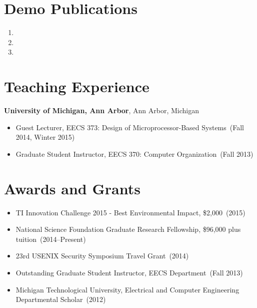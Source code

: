 \documentclass{article}
\begin{document}
\section*{Demo Publications}
\begin{enumerate}
  \item {}
  \item {}
  \item {}
\end{enumerate}




\section*{Teaching Experience}
\vspace{-6pt}
{\bf University of Michigan, Ann Arbor}, Ann Arbor, Michigan
\vspace{-6pt}
\begin{itemize}
  \item[] Guest Lecturer, EECS 373: Design of Microprocessor-Based Systems~(Fall 2014, Winter 2015)
  \item[] Graduate Student Instructor, EECS 370: Computer Organization~(Fall 2013)
\end{itemize}

\section*{Awards and Grants}
\vspace{-6pt}
\begin{itemize}
  \item[] TI Innovation Challenge 2015 - Best Environmental Impact, \$2,000~(2015)
  \item[] National Science Foundation Graduate Research Fellowship, \$96,000 plus tuition~(2014--Present)
  \item[] 23rd USENIX Security Symposium Travel Grant~(2014)
  \item[] Outstanding Graduate Student Instructor, EECS Department~(Fall 2013)
  \item[] Michigan Technological University, Electrical and Computer Engineering Departmental Scholar~(2012)
\end{itemize}
\end{document}
